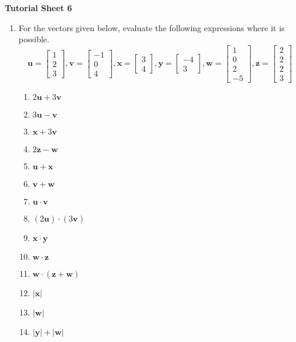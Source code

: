 \documentclass[11pt,a4paper,titlepage,oneside,openany]{article}
\numberwithin{equation}{section}
\numberwithin{algorithm}{section}
\numberwithin{figure}{section}
\numberwithin{table}{section}
\renewcommand{\vec}[1]{\mathbf{#1}}
\begin{document}
	
	\begin{center}
		\textbf{Tutorial Sheet 6}
	\end{center}
	
	\begin{enumerate}
		\item For the vectors given below, evaluate the following expressions where it is possible.
		\begin{equation*}
		\vec{u}=\left[ \begin{array}{c} 1 \\ 2 \\ 3 \end{array}\right],
		\vec{v}=\left[ \begin{array}{c} -1 \\ 0 \\ 4 \end{array}\right],
		\vec{x}=\left[ \begin{array}{c} 3 \\ 4 \end{array}\right],
		\vec{y}=\left[ \begin{array}{c} -4 \\ 3 \end{array}\right],
		\vec{w}=\left[ \begin{array}{c} 1 \\ 0\\ 2 \\ -5 \end{array}\right],
		\vec{z}=\left[ \begin{array}{c} 2 \\ 2 \\ 2 \\ 3 \end{array}\right]
		\end{equation*}
		\begin{multicols}{3}
			\begin{enumerate}
				\item $2\vec{u} + 3\vec{v}$
				\item $3\vec{u} - \vec{v}$
				\item $\vec{x} + 3\vec{v}$
				\item $2\vec{z} - \vec{w}$
				\item $\vec{u}+\vec{x}$
				\item $\vec{v}+\vec{w}$
				\item $\vec{u}\cdot \vec{v}$
				\item $\left(2\vec{u}\right)\cdot \left(3\vec{v}\right)$
				\item $\vec{x}\cdot \vec{y}$
				\item $\vec{w} \cdot \vec{z}$
				\item $\vec{w} \cdot (\vec{z}+\vec{w})$
				\item $|\vec{x}|$
				\item $|\vec{w}|$
				\item $|\vec{y}|+|\vec{w}|$
			\end{enumerate}
		\end{multicols}
		

\end{enumerate}
\end{document}
